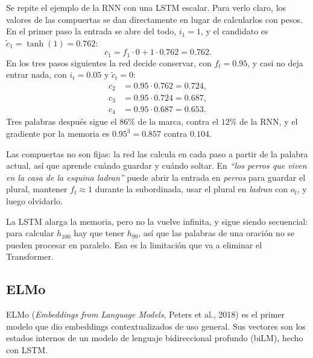 \documentclass[11pt,letterpaper]{article}
\begin{document}
\begin{ejemplo}
    Se repite el ejemplo de la RNN con una LSTM escalar. Para verlo
    claro, los valores de las compuertas se dan directamente en lugar
    de calcularlos con pesos. En el primer paso la entrada se abre del
    todo, $i_1 = 1$, y el candidato es
    $\tilde{c}_1 = \tanh(1) = 0.762$:
    \[
        c_1 = f_1 \cdot 0 + 1 \cdot 0.762 = 0.762 .
    \]
    En los tres pasos siguientes la red decide conservar, con
    $f_t = 0.95$, y casi no deja entrar nada, con $i_t = 0.05$ y
    $\tilde{c}_t = 0$:
    \begin{align*}
        c_2 &= 0.95 \cdot 0.762 = 0.724 , \\
        c_3 &= 0.95 \cdot 0.724 = 0.687 , \\
        c_4 &= 0.95 \cdot 0.687 = 0.653 .
    \end{align*}
    Tres palabras después sigue el $86\%$ de la marca, contra el $12\%$
    de la RNN, y el gradiente por la memoria es
    $0.95^3 = 0.857$ contra $0.104$.

    Las compuertas no son fijas: la red las calcula en cada paso a
    partir de la palabra actual, así que aprende cuándo guardar y
    cuándo soltar. En \textit{``los perros que viven en la casa de la
    esquina ladran''} puede abrir la entrada en \textit{perros} para
    guardar el plural, mantener $f_t \approx 1$ durante la
    subordinada, usar el plural en \textit{ladran} con $o_t$, y luego
    olvidarlo.
\end{ejemplo}

\begin{ojo}
    La LSTM alarga la memoria, pero no la vuelve infinita, y sigue
    siendo secuencial: para calcular $h_{100}$ hay que tener
    $h_{99}$, así que las palabras de una oración no se pueden
    procesar en paralelo. Esa es la limitación que va a eliminar el
    Transformer.
\end{ojo}


\subsection*{ELMo}

ELMo (\textit{Embeddings from Language Models}, Peters et al., 2018)
es el primer modelo que dio embeddings contextualizados de uso
general. Sus vectores son los estados internos de un modelo de
lenguaje bidireccional profundo (biLM), hecho con LSTM.
\end{document}
